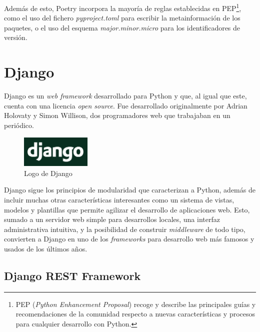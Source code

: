 Además de esto, Poetry incorpora la mayoría de reglas establecidas en PEP\footnote{PEP (\emph{Python Enhancement Proposal}) recoge y describe las principales guías y recomendaciones de la comunidad respecto a nuevas características y procesos para cualquier desarrollo con Python.}, como el uso del fichero \emph{pyproject.toml} para escribir la metainformación de los paquetes, o el uso del esquema \emph{major.minor.micro} para los identificadores de versión. \emph{\parencite{Reference6}}


\section{Django}

Django es un \emph{web framework} desarrollado para Python y que, al igual que este, cuenta con una licencia \emph{open source}. Fue desarrollado originalmente por Adrian Holovaty y Simon Willison, dos programadores web que trabajaban en un periódico. \emph{\parencite{Reference4}}

\begin{figure}[ht]
    \centering
    \includegraphics[width=0.3\textwidth]{Figures/django-logo}
    \decoRule
    \caption[Django (Logo)]{Logo de Django \emph{\parencite{Reference5}}}
    \label{fig:django-logo}
\end{figure}

Django sigue los principios de modularidad que caracterizan a Python, además de incluir muchas otras características interesantes como un sistema de vistas, modelos y plantillas que permite agilizar el desarrollo de aplicaciones web. Esto, sumado a un servidor web simple para desarrollos locales, una interfaz administrativa intuitiva, y la posibilidad de construir \emph{middleware} de todo tipo, convierten a Django en uno de los \emph{frameworks} para desarrollo web más famosos y usados de los últimos años. \emph{\parencite{Reference4}}

\subsection{Django REST Framework}

